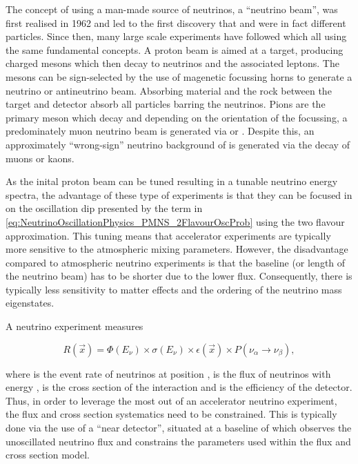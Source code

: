 The concept of using a man-made source of neutrinos, a ``neutrino beam'',  was first realised in 1962 \cite{Danby1962-ph} and led to the first discovery that  and \quickmath{\nu_{\mu}} were in fact different particles. Since then, many large scale experiments have followed which all using the same fundamental concepts. A proton beam is aimed at a target, producing charged mesons which then decay to neutrinos and the associated leptons. The mesons can be sign-selected by the use of magenetic focussing horns to generate a neutrino or antineutrino beam. Absorbing material and the rock between the target and detector absorb all particles barring the neutrinos. Pions are the primary meson which decay and depending on the orientation of the focussing, a predominately muon neutrino beam is generated via \quickmath{\pi^{+} \rightarrow \mu^{+} + \nu_{\mu}} or \quickmath{\pi^{-} \rightarrow \mu^{-} + \bar{\nu}_{\mu}}. Despite this, an approximately  ``wrong-sign'' neutrino background of  is generated via the decay of muons or kaons. 

As the inital proton beam can be tuned resulting in a tunable neutrino energy spectra, the advantage of these type of experiments is that they can be focused in on the oscillation dip presented by the  term in \autoref{eq:NeutrinoOscillationPhysics_PMNS_2FlavourOscProb} using the two flavour approximation. This tuning means that accelerator experiments are typically more sensitive to the atmospheric mixing parameters. However, the disadvantage compared to atmospheric neutrino experiments is that the baseline (or length of the neutrino beam) has to be shorter due to the lower flux. Consequently, there is typically less sensitivity to matter effects and the ordering of the neutrino mass eigenstates.

A neutrino experiment measures

\begin{equation}
  \label{eq:NeutrinoOscillationPhysics_DetectorMeasurement}
  R(\vec{x}) = \Phi(E_{\nu}) \times \sigma(E_{\nu}) \times \epsilon(\vec{x}) \times P(\nu_{\alpha} \rightarrow \nu_{\beta}),
\end{equation}

where  is the event rate of neutrinos at position ,  is the flux of neutrinos with energy ,  is the cross section of the interaction and  is the efficiency of the detector. Thus, in order to leverage the most out of an accelerator neutrino experiment, the flux and cross section systematics need to be constrained. This is typically done via the use of a ``near detector'', situated at a baseline of  which observes the unoscillated neutrino flux and constrains the parameters used within the flux and cross section model.

